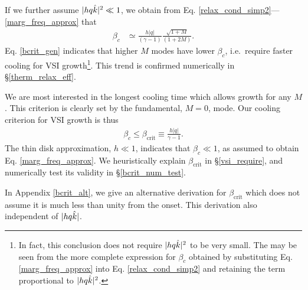 If we further assume $|hq\hat{k}|^2\ll 1$, we obtain from
Eq. \ref{relax_cond_simp2}---\ref{marg_freq_approx} that  
\begin{align}\label{bcrit_gen} 
  \beta_c &\simeq  \frac{h|q|}{(\gamma - 1)}\frac{\sqrt{1+M}}{(1+2M)}.   
\end{align}
Eq. \ref{bcrit_gen} indicates that higher $M$ modes have lower $\beta_c$,
i.e.\ require faster cooling for VSI growth\footnote{In fact,   
  this conclusion does not require $|hq\hat{k}|^2$ to be very 
  small. The may be seen from the more complete expression for
  $\beta_c$ obtained by substituting Eq. \ref{marg_freq_approx} into  
  Eq. \ref{relax_cond_simp2} and retaining the term proportional to 
  $|hq\hat{k}|^2$.}.    
This trend is confirmed numerically in \S\ref{therm_relax_eff}. 


We are most interested in the longest cooling time which allows growth for any $M$.  
This criterion is clearly set by the fundamental, $M = 0$, mode.  Our
cooling criterion for  
VSI growth is thus  
 \begin{align}\label{iso_vsi_cond}
  \beta_c\leq \beta_\mathrm{crit}  \equiv
  \frac{h|q|}{\gamma-1} . 
\end{align}
The thin disk approximation, $h \ll 1$, indicates that $\beta_c \ll
1$, as assumed to obtain Eq. \ref{marg_freq_approx}. We heuristically
explain $\beta_\mathrm{crit}$ in \S\ref{vsi_require}, and numerically
test its validity in \S\ref{bcrit_num_test}.  
 
In Appendix \ref{bcrit_alt}, we give an alternative derivation for 
$\beta_\mathrm{crit}$ which does not assume it is much less
than unity from the onset. This derivation also independent of $|h q
\hat{k}|$.      

